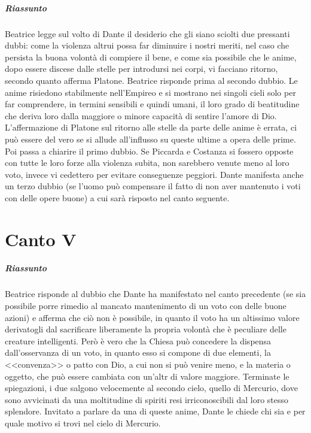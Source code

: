 \documentclass[a4paper, twoside, titlepage]{book}
\begin{document}
\paragraph{Riassunto} Beatrice legge sul volto di Dante il desiderio che gli siano sciolti due pressanti dubbi: come la violenza altrui possa far diminuire i nostri meriti, nel caso che persista la buona volontà di compiere il bene, e come sia possibile che le anime, dopo essere discese dalle stelle per introdursi nei corpi, vi facciano ritorno, secondo quanto afferma Platone. Beatrice risponde prima al secondo dubbio. Le anime risiedono stabilmente nell'Empireo e si mostrano nei singoli cieli solo per far comprendere, in termini sensibili e quindi umani, il loro grado di beatitudine che deriva loro dalla maggiore o minore capacità di sentire l'amore di Dio. L'affermazione di Platone sul ritorno alle stelle da parte delle anime è errata, ci può essere del vero se si allude all'influsso su queste ultime a opera delle prime. Poi passa a chiarire il primo dubbio. Se Piccarda  e Costanza si fossero opposte con tutte le loro forze alla violenza subita, non sarebbero venute meno al loro voto, invece vi cedettero per evitare conseguenze peggiori. Dante manifesta anche un terzo dubbio (se l'uomo può compensare il fatto di non aver mantenuto i voti con delle opere buone) a cui sarà risposto nel canto seguente.

\chapter{Canto V}

\paragraph{Riassunto} Beatrice risponde al dubbio che Dante ha manifestato nel canto precedente (se sia possibile porre rimedio al mancato mantenimento di un voto con delle buone azioni) e afferma che ciò non è possibile, in quanto il voto ha un altissimo valore derivatogli dal sacrificare liberamente la propria volontà che è peculiare delle creature intelligenti. Però è vero che la Chiesa può concedere la dispensa dall'osservanza di un voto, in quanto esso si compone di due elementi, la <<convenza>> o patto con Dio, a cui non si può venire meno, e la materia o oggetto, che può essere cambiata con un'altr di valore maggiore. Terminate le spiegazioni, i due salgono velocemente al secondo cielo, quello di Mercurio, dove sono avvicinati da una moltitudine di spiriti resi irriconoscibili dal loro stesso splendore. Invitato a parlare da una di queste anime, Dante le chiede chi sia e per quale motivo si trovi nel cielo di Mercurio.
\end{document}
